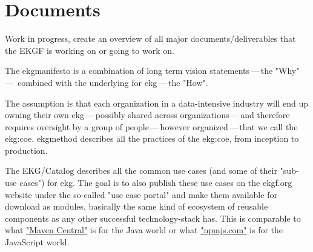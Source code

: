 \chapter{ Documents}\label{ch:ekgf-documents}

Work in progress, create an overview of all major documents/deliverables that the EKGF is working on or going to work on.

\begin{description}[font=\bfseries,leftmargin=0cm]

    \item[\gls{ekgmanifesto}]
        The \gls{ekgmanifesto} is a combination of long term vision statements\,---\,the
        "Why"\,---\, combined with the underlying 
        for \gls{ekg}\,---\,the "How".

    \item[\gls{ekgmethod}]
        The assumption is that each organization in a data-intensive industry will end up
        owning their own \gls{ekg}\,---\,possibly shared across organizations\,---\,and therefore
        requires oversight by a group of people\,---\,however organized\,---\,that we call
        the \gls{ekg:coe}.
        \gls{ekgmethod} describes all the practices of the \gls{ekg:coe}, from inception to production.

    \item[EKG/Catalog]
        The EKG/Catalog describes all the common use cases (and some of their "sub-use cases")
        for \gls{ekg}.
        The goal is to also publish these use cases on the ekgf.org website under the so-called
        "use case portal" and make them available for download as modules, basically the same
        kind of ecosystem of reusable components as any other successful technology-stack has.
        This is comparable to what \href{https://central.sonatype.org/}{"Maven Central"} is for
        the Java world or what \href{https://docs.npmjs.com/about-npm}{"npmjs.com"} is for the
        JavaScript world.

\end{description}



